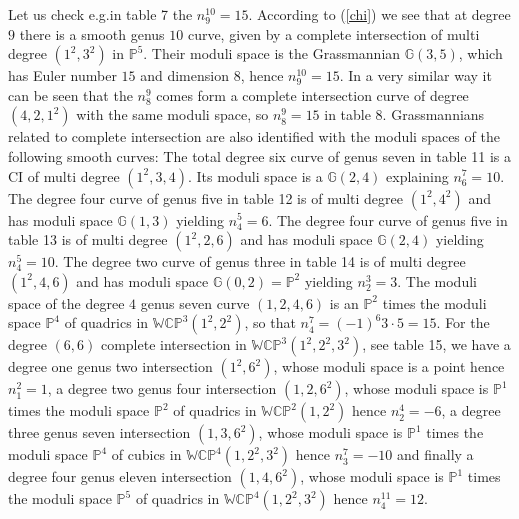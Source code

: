 \documentclass[12pt]{article}
\begin{document}
Let us check e.g.in table 7 the $n_9^{10}=15$. According
to (\ref{chi}) we see that at degree $9$ there is a smooth genus
$10$ curve, given by a complete intersection of multi degree $(1^2,3^2)$ in
$\mathbb{P}^5$. Their moduli space is the Grassmannian
$\mathbb{G}(3,5)$, which has Euler number $15$ and dimension $8$,
hence  $n_9^{10}=15$. In a very  similar way it can be seen that
the $n_8^9$ comes form a complete intersection curve of degree
 $(4,2,1^2)$ with the same moduli
space, so $n_8^9=15$ in table 8. Grassmannians related to complete
intersection are also identified with the moduli spaces of the
following smooth curves: The total degree six curve of genus seven
in table 11 is a CI of multi degree $(1^2,3,4)$. Its moduli space
is a $\mathbb{G}(2,4)$ explaining $n_6^7=10$. The degree four
curve of genus five in table 12 is of multi degree $(1^2,4^2)$ and
has moduli space $\mathbb{G}(1,3)$ yielding $n_4^5=6$.  The degree
four curve of genus five in table 13 is of multi degree
$(1^2,2,6)$ and has moduli space $\mathbb{G}(2,4)$ yielding
$n_4^5=10$.  The degree two curve of genus three in table 14 is of
multi degree $(1^2,4,6)$ and has moduli space
$\mathbb{G}(0,2)=\mathbb{P}^2$ yielding $n_2^3=3$. The moduli
space of the degree $4$ genus seven curve $(1,2,4,6)$ is an
$\mathbb{P}^2$ times the moduli space $\mathbb{P}^4$ of quadrics
in $\mathbb{WCP}^3(1^2,2^2)$, so that $n_4^7=(-1)^6 3\cdot 5=15$.
For the degree $(6,6)$ complete intersection in
$\mathbb{WCP}^3(1^2,2^2,3^2)$, see table 15, we have a degree one
genus two intersection $(1^2,6^2)$, whose moduli space is a point
hence $n_1^2=1$, a degree two genus four intersection $(1,2,6^2)$,
whose moduli space is $\mathbb{P}^1$ times the moduli space
$\mathbb{P}^2$ of quadrics in $\mathbb{WCP}^2(1,2^2)$ hence
$n_2^4=-6$, a degree three  genus seven intersection $(1,3,6^2)$,
whose moduli space is $\mathbb{P}^1$ times the moduli space
$\mathbb{P}^4$ of cubics in $\mathbb{WCP}^4(1,2^2,3^2)$ hence
$n_3^7=-10$ and finally  a degree four genus eleven intersection
$(1,4,6^2)$, whose moduli space is  $\mathbb{P}^1$ times the
moduli space $\mathbb{P}^5$ of quadrics in
$\mathbb{WCP}^4(1,2^2,3^2)$ hence $n_4^{11}=12$.
\end{document}
